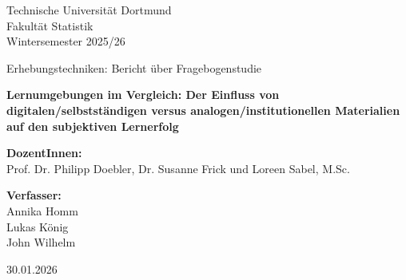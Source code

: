 \documentclass[a4paper, 12pt]{article}
\begin{document}
\begin{titlepage}

	\begin{center}
		\Large
		Technische Universität Dortmund\\
		Fakultät Statistik\\
		Wintersemester 2025/26\\
		
		\vfill %
		
		Erhebungstechniken: Bericht über Fragebogenstudie
		
		\vspace{1em} %
		
		\Huge
		\textbf{Lernumgebungen im Vergleich: Der Einfluss von digitalen/selbstständigen versus analogen/institutionellen Materialien auf den subjektiven Lernerfolg}
		
		\vfill
		
		\Large
		\textbf{DozentInnen:}\\
		Prof. Dr. Philipp Doebler, Dr. Susanne Frick und Loreen Sabel, M.Sc.
		
		\vfill
		
		\textbf{Verfasser:}\\
		Annika Homm\\
		Lukas König\\
		John Wilhelm
		
		\vfill
		
		30.01.2026
	\end{center}
	
	\restoregeometry
\end{titlepage}

\end{document}
